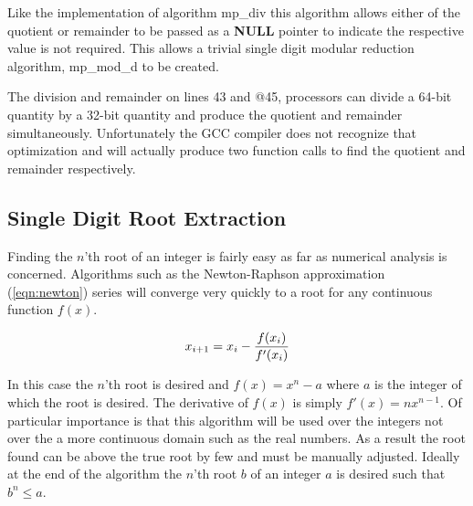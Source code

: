 \documentclass[b5paper]{book}
\begin{document}
Like the implementation of algorithm mp\_div this algorithm allows either of the quotient or remainder to be passed as a \textbf{NULL} pointer to
indicate the respective value is not required.  This allows a trivial single digit modular reduction algorithm, mp\_mod\_d to be created.

The division and remainder on lines 43 and @45,%
processors can divide a 64-bit quantity by a 32-bit quantity and produce the quotient and remainder simultaneously.  Unfortunately the GCC 
compiler does not recognize that optimization and will actually produce two function calls to find the quotient and remainder respectively.  

\subsection{Single Digit Root Extraction}

Finding the $n$'th root of an integer is fairly easy as far as numerical analysis is concerned.  Algorithms such as the Newton-Raphson approximation 
(\ref{eqn:newton}) series will converge very quickly to a root for any continuous function $f(x)$.  

\begin{equation}
x_{i+1} = x_i - {f(x_i) \over f'(x_i)}
\label{eqn:newton}
\end{equation}

In this case the $n$'th root is desired and $f(x) = x^n - a$ where $a$ is the integer of which the root is desired.  The derivative of $f(x)$ is 
simply $f'(x) = nx^{n - 1}$.  Of particular importance is that this algorithm will be used over the integers not over the a more continuous domain
such as the real numbers.  As a result the root found can be above the true root by few and must be manually adjusted.  Ideally at the end of the 
algorithm the $n$'th root $b$ of an integer $a$ is desired such that $b^n \le a$.  
\end{document}
